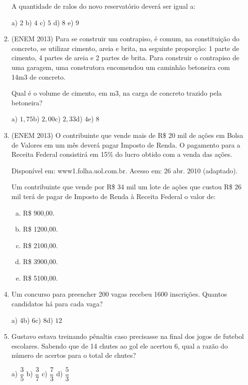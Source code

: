 \begin{multicols*}{2}
\begin{enumerate}[wide, labelwidth=!, labelindent=0pt]
		      A quantidade de ralos do novo reservatório deverá ser igual a:

		      a) $2 $ b) $4 $ c) $5 $ d) $8 $ e) $9 $

		\item (ENEM 2013) Para se construir um contrapiso, é comum, na constituição do concreto, se utilizar cimento, areia e brita, na seguinte proporção: 1 parte de cimento, 4 partes de areia e 2 partes de brita. Para construir o contrapiso de uma
		      garagem, uma construtora encomendou um caminhão betoneira com 14m3 de concreto.

		      Qual é o volume de cimento, em m3, na carga de concreto trazido pela betoneira?\\
		      \centerline{
			      a) $1,75$\quad b) $2,00$\quad c) $2,33$\quad d) $4$\quad e) $8$
		      }
		\item (ENEM 2013) O contribuinte que vende mais de R\$ 20 mil de ações em Bolsa de Valores em um mês deverá pagar Imposto de Renda. O pagamento para a Receita Federal consistirá em 15\% do lucro obtido com a venda das ações.

		\noindent Disponível em: www1.folha.uol.com.br. Acesso em: 26
		abr. 2010 (adaptado).

		Um contribuinte que vende por R\$ 34 mil um lote de ações que custou R\$ 26 mil terá de pagar de Imposto de Renda à
		Receita Federal o valor de:
		\begin{enumerate}[(a)]
			\item R\$ 900,00.
			\item R\$ 1200,00.
			\item R\$ 2100,00.
			\item R\$ 3900,00.
			\item R\$ 5100,00.
		\end{enumerate}

		\item Um concurso para preencher 200 vagas recebeu 1600 inscrições. Quantos candidatos há para cada vaga?

		\centerline{a) $4$\quad b) $6$\quad c) $8$\quad d) $12$}

		\item Gustavo estava treinando pênaltis caso precisasse na final dos jogos de futebol escolares. Sabendo que de 14 chutes ao gol ele acertou 6, qual a razão do número de acertos para o total de chutes?

		      a) $\dfrac{3}{5} $ b) $\dfrac{3}{7} $ c) $\dfrac{7}{3} $ d) $\dfrac{5}{3} $


\end{enumerate}
\end{multicols*}
